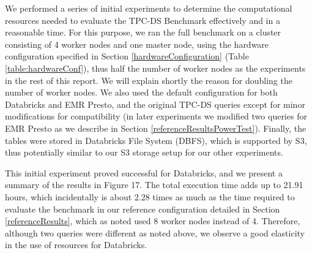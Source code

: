 We performed a series of initial experiments to determine the computational resources needed to evaluate the TPC-DS Benchmark effectively and in a reasonable time. For this purpose, we ran the full benchmark on a cluster consisting of 4 worker nodes and one master node, using the hardware configuration specified in Section \ref{hardwareConfiguration} (Table \ref{table:hardwareConf}), thus half the number of worker nodes as the experiments in the rest of this report. We will explain shortly the reason for doubling the number of worker nodes. We also used the default configuration for both Databricks and EMR Presto, and the original TPC-DS queries except for minor modifications for compatibility (in later experiments we modified two queries for EMR Presto as we describe in Section \ref{referenceResultsPowerTest}). Finally, the tables were stored in Databricks File System (DBFS), which is supported by S3, thus potentially similar to our S3 storage setup for our other experiments.

This initial experiment proved successful for Databricks, and we present a summary of the results in Figure 17. The total execution time adds up to 21.91 hours, which incidentally is about 2.28 times as much as the time required to evaluate the benchmark in our reference configuration detailed in Section \ref{referenceResults}, which as noted used 8 worker nodes instead of 4. Therefore, although two queries were different as noted above, we observe a good elasticity in the use of resources for Databricks.



